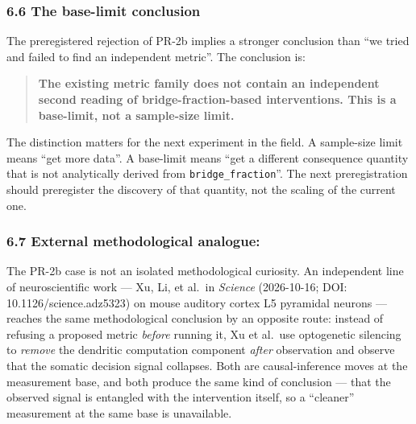 \documentclass[
]{article}
\begin{document}
\subsubsection{6.6 The base-limit
conclusion}\label{the-base-limit-conclusion-1}

The preregistered rejection of PR-2b implies a stronger conclusion than
``we tried and failed to find an independent metric''. The conclusion
is:

\begin{quote}
\textbf{The existing metric family does not contain an independent
second reading of bridge-fraction-based interventions. This is a
base-limit, not a sample-size limit.}
\end{quote}

The distinction matters for the next experiment in the field. A
sample-size limit means ``get more data''. A base-limit means ``get a
different consequence quantity that is not analytically derived from
\texttt{bridge\_fraction}''. The next preregistration should preregister
the discovery of that quantity, not the scaling of the current one.

\subsubsection{6.7 External methodological analogue: \citet{ref07}}\label{external-methodological-analogue-xu-et-al.-2026}

The PR-2b case is not an isolated methodological curiosity. An
independent line of neuroscientific work --- Xu, Li, et al.~in
\emph{Science} (2026-10-16; DOI: 10.1126/science.adz5323) on mouse
auditory cortex L5 pyramidal neurons --- reaches the same methodological
conclusion by an opposite route: instead of refusing a proposed metric
\emph{before} running it, Xu et al.~use optogenetic silencing to
\emph{remove} the dendritic computation component \emph{after}
observation and observe that the somatic decision signal collapses. Both
are causal-inference moves at the measurement base, and both produce the
same kind of conclusion --- that the observed signal is entangled with
the intervention itself, so a ``cleaner'' measurement at the same base
is unavailable.
\end{document}
